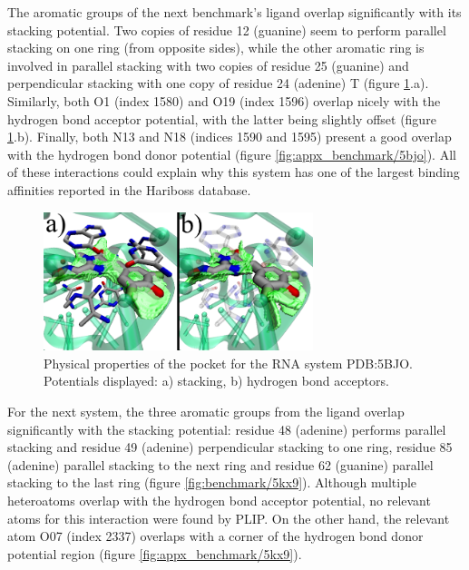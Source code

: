     The aromatic groups of the next benchmark's ligand overlap significantly with its stacking potential. Two copies of residue 12 (guanine) seem to perform parallel stacking on one ring (from opposite sides), while the other aromatic ring is involved in parallel stacking with two copies of residue 25 (guanine) and perpendicular stacking with one copy of residue 24 (adenine) T (figure \ref{fig:benchmark/5bjo}.a). Similarly, both O1 (index 1580) and O19 (index 1596) overlap nicely with the hydrogen bond acceptor potential, with the latter being slightly offset (figure \ref{fig:benchmark/5bjo}.b). Finally, both N13 and N18 (indices 1590 and 1595) present a good overlap with the hydrogen bond donor potential (figure \ref{fig:appx_benchmark/5bjo}). All of these interactions could explain why this system has one of the largest binding affinities reported in the Hariboss database.

    \begin{figure}[H]
      \centering
      \includegraphics[width=0.7\textwidth]{figures/results/benchmark_rna/5bjo.png}
      \caption{\label{fig:benchmark/5bjo} Physical properties of the pocket for the RNA system PDB:5BJO. Potentials displayed: a) stacking, b) hydrogen bond acceptors.}
    \end{figure}

    For the next system, the three aromatic groups from the ligand overlap significantly with the stacking potential: residue 48 (adenine) performs parallel stacking and residue 49 (adenine) perpendicular stacking to one ring, residue 85 (adenine) parallel stacking to the next ring and residue 62 (guanine) parallel stacking to the last ring (figure \ref{fig:benchmark/5kx9}). Although multiple heteroatoms overlap with the hydrogen bond acceptor potential, no relevant atoms for this interaction were found by PLIP. On the other hand, the relevant atom O07 (index 2337) overlaps with a corner of the hydrogen bond donor potential region (figure \ref{fig:appx_benchmark/5kx9}).

